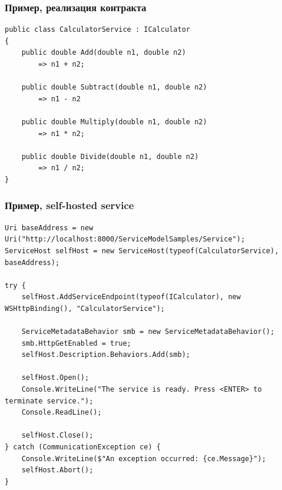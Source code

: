 \documentclass[xetex,mathserif,serif]{beamer}
\begin{document}
    \begin{frame}[fragile]
        \frametitle{Пример, реализация контракта}
        \begin{small}
            \begin{verbatim}
public class CalculatorService : ICalculator  
{
    public double Add(double n1, double n2)
        => n1 + n2;  

    public double Subtract(double n1, double n2)
        => n1 - n2

    public double Multiply(double n1, double n2)  
        => n1 * n2;

    public double Divide(double n1, double n2)  
        => n1 / n2;
}
            \end{verbatim}
        \end{small}
    \end{frame}

    \begin{frame}[fragile]
        \frametitle{Пример, self-hosted service}
        \begin{scriptsize}
            \begin{verbatim}
Uri baseAddress = new Uri("http://localhost:8000/ServiceModelSamples/Service");
ServiceHost selfHost = new ServiceHost(typeof(CalculatorService), baseAddress);

try {
    selfHost.AddServiceEndpoint(typeof(ICalculator), new WSHttpBinding(), "CalculatorService");

    ServiceMetadataBehavior smb = new ServiceMetadataBehavior();
    smb.HttpGetEnabled = true;
    selfHost.Description.Behaviors.Add(smb);

    selfHost.Open();
    Console.WriteLine("The service is ready. Press <ENTER> to terminate service.");
    Console.ReadLine();

    selfHost.Close();  
} catch (CommunicationException ce) {
    Console.WriteLine($"An exception occurred: {ce.Message}");
    selfHost.Abort();
}
            \end{verbatim}
        \end{scriptsize}
    \end{frame}
\end{document}
